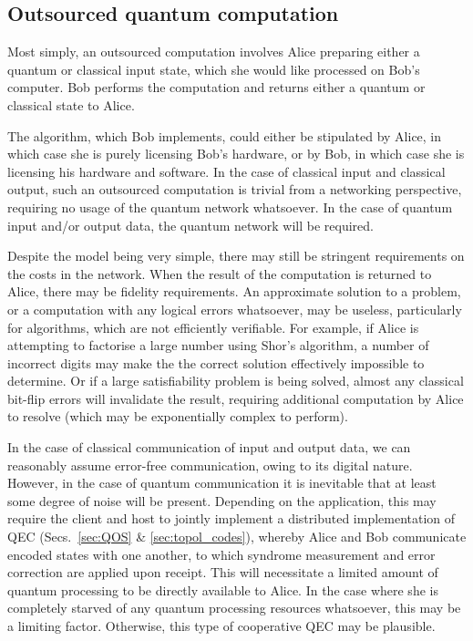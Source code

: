 \documentclass[aps, rmp, twocolumn, amsmath, amssymb, nofootinbib, superscriptaddress, longbibliography, floatfix, table-of-contents, eqsecnum]{revtex4-1}
\begin{document}
%
%

\subsection{Outsourced quantum computation} 

Most simply, an outsourced computation involves Alice preparing either a quantum or classical input state, which she would like processed on Bob's computer. Bob performs the computation and returns either a quantum or classical state to Alice.

The algorithm, which Bob implements, could either be stipulated by Alice, in which case she is purely licensing Bob's hardware, or by Bob, in which case she is licensing his hardware and software. In the case of classical input and classical output, such an outsourced computation is trivial from a networking perspective, requiring no usage of the quantum network whatsoever. In the case of quantum input and/or output data, the quantum network will be required.

Despite the model being very simple, there may still be stringent requirements on the costs in the network. When the result of the computation is returned to Alice, there may be fidelity requirements. An approximate solution to a problem, or a computation with any logical errors whatsoever, may be useless, particularly for algorithms, which are not efficiently verifiable. For example, if Alice is attempting to factorise a large number using Shor's algorithm, a number of incorrect digits may make the the correct solution effectively impossible to determine. Or if a large satisfiability problem is being solved, almost any classical bit-flip errors will invalidate the result, requiring additional computation by Alice to resolve (which may be exponentially complex to perform).

In the case of classical communication of input and output data, we can reasonably assume error-free communication, owing to its digital nature. However, in the case of quantum communication it is inevitable that at least some degree of noise will be present. Depending on the application, this may require the client and host to jointly implement a distributed implementation of QEC (Secs.~\ref{sec:QOS} \& \ref{sec:topol_codes}), whereby Alice and Bob communicate encoded states with one another, to which syndrome measurement and error correction are applied upon receipt. This will necessitate a limited amount of quantum processing to be directly available to Alice. In the case where she is completely starved of any quantum processing resources whatsoever, this may be a limiting factor. Otherwise, this type of cooperative QEC may be plausible.
\end{document}
